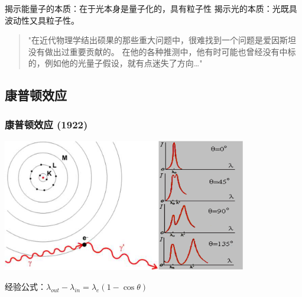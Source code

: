 \begin{frame} 
    \begin{tcolorbox4}[光量子假说的意义]
        \begin{itemize}
            \Item  揭示能量子的本质：在于光本身是量子化的，具有粒子性
            \Item  揭示光的本质：光既具波动性又具粒子性。
        \end{itemize}
    \end{tcolorbox4}
    \begin{quotation}
        "在近代物理学结出硕果的那些重大问题中，很难找到一个问题是爱因斯坦没有做出过重要贡献的。
        在他的各种推测中，他有时可能也曾经没有中标的，例如他的光量子假设，就有点迷失了方向\dots"  \\
    \end{quotation}
\end{frame}

\subsection{康普顿效应}

\begin{frame}   
    \frametitle{康普顿效应 (1922)}
    \begin{center}
        \includegraphics[width=0.8\textwidth]{figs/compton.png}
    \end{center}  
    经验公式：$\lambda_{out}-\lambda_{in}=\lambda_e(1-\cos \theta)$
\end{frame}

